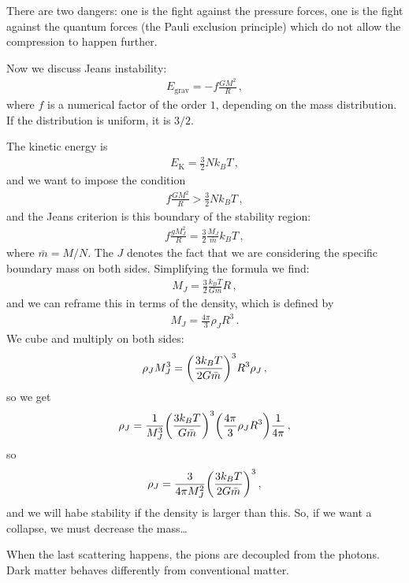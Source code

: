 \documentclass[main.tex]{subfiles}
\begin{document}
There are two dangers: one is the fight against the pressure forces, one is the fight against the quantum forces (the Pauli exclusion principle) which do not allow the compression to happen further. 

Now we discuss Jeans instability: 
%
\begin{align}
  E _{\text{grav}} = - f \frac{GM^2}{R}
\,,
\end{align}
%
where \(f\) is a numerical factor of the order \(1\), depending on the mass distribution. If the distribution is uniform, it is \(3/2\).

The kinetic energy is 
%
\begin{align}
  E _{\text{K}} = \frac{3}{2} N k_B T
\,,
\end{align}
%
and we want to impose the condition 
%
\begin{align}
  f \frac{GM^2}{R} > \frac{3}{2} N k_B T 
\,,
\end{align}
%
and the Jeans criterion is this boundary of the stability region: 
%
\begin{align}
  f \frac{gM_J^2}{R} = \frac{3}{2} \frac{M_J}{\bar{m}} k_B T
\,,
\end{align}
%
where \(\bar{m} = M / N\). 
The \(J\) denotes the fact that we are considering the specific boundary mass on both sides. Simplifying the formula we find: 
%
\begin{align}
  M_J = \frac{3}{2} \frac{k_B T }{G \bar{m}} R
\,,
\end{align}
%
and we can reframe this in terms of the density, which is defined by 
%
\begin{align}
  M_J = \frac{4 \pi }{3} \rho _J R^3
\,.
\end{align}
%
We cube and multiply on both sides: 
%
\begin{align}
  \rho_J M_J^3 = \qty(\frac{3 k_B T}{2 G \bar{m}})^3R^3 \rho_J
\,,
\end{align}
%
so we get 
%
\begin{align}
  \rho_J = \frac{1}{M_J^3} \qty(\frac{3 k_B T}{G \bar{m}})^3 \qty( \frac{4 \pi }{3} \rho_J R^3) \frac{1}{4 \pi }
\,,
\end{align}
%
so 
%
\begin{align}
  \rho _J = \frac{3}{4 \pi M_J^2} \qty(\frac{3 k_B T}{2 G \bar{m}})^3
\,,
\end{align}
%
and we will habe stability if the density is larger than this. So, if we want a collapse, we must decrease the mass\dots

When the last scattering happens, the pions are decoupled from the photons. Dark matter behaves differently from conventional matter. 
\end{document}
